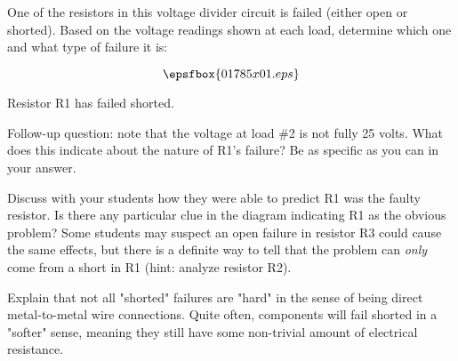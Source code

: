 

One of the resistors in this voltage divider circuit is failed (either open or shorted).  Based on the voltage readings shown at each load, determine which one and what type of failure it is:

$$\epsfbox{01785x01.eps}$$







Resistor R1 has failed shorted.

\vskip 10pt

Follow-up question: note that the voltage at load \#2 is not fully 25 volts.  What does this indicate about the nature of R1's failure?  Be as specific as you can in your answer.







Discuss with your students how they were able to predict R1 was the faulty resistor.  Is there any particular clue in the diagram indicating R1 as the obvious problem?  Some students may suspect an open failure in resistor R3 could cause the same effects, but there is a definite way to tell that the problem can {\it only} come from a short in R1 (hint: analyze resistor R2). 

Explain that not all "shorted" failures are "hard" in the sense of being direct metal-to-metal wire connections.  Quite often, components will fail shorted in a "softer" sense, meaning they still have some non-trivial amount of electrical resistance.




